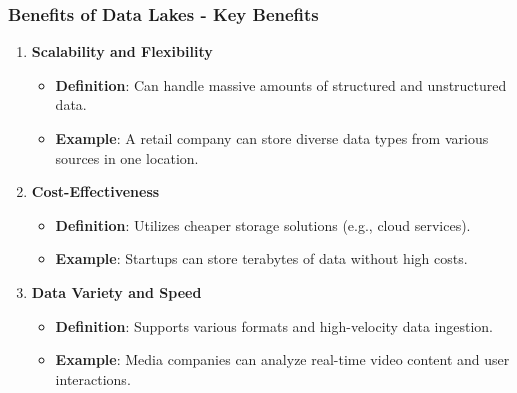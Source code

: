 \documentclass[aspectratio=169]{beamer}
\begin{document}
\begin{frame}[fragile]
    \frametitle{Benefits of Data Lakes - Key Benefits}
    \begin{enumerate}
        \item \textbf{Scalability and Flexibility}
            \begin{itemize}
                \item \textbf{Definition}: Can handle massive amounts of structured and unstructured data.
                \item \textbf{Example}: A retail company can store diverse data types from various sources in one location.
            \end{itemize}

        \item \textbf{Cost-Effectiveness}
            \begin{itemize}
                \item \textbf{Definition}: Utilizes cheaper storage solutions (e.g., cloud services).
                \item \textbf{Example}: Startups can store terabytes of data without high costs.
            \end{itemize}
        
        \item \textbf{Data Variety and Speed}
            \begin{itemize}
                \item \textbf{Definition}: Supports various formats and high-velocity data ingestion.
                \item \textbf{Example}: Media companies can analyze real-time video content and user interactions.
            \end{itemize}
    \end{enumerate}
\end{frame}
\end{document}
